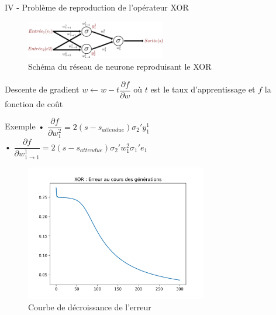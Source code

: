 \documentclass[10pt]{beamer}
\begin{document}
\begin{frame}{IV - Problème de reproduction de l'opérateur XOR}
\begin{figure}
	\centering
    \includegraphics[width=230px]{3-Model.png}
	\caption{Schéma du réseau de neurone reproduisant le XOR}
\end{figure}
\begin{block}{Descente de gradient}
$w \leftarrow w - t \dfrac{\partial f}{\partial w}$ où $t$ est le taux d'apprentissage et $f$ la fonction de coût
\end{block}
\begin{exampleblock}{Exemple}
• $\dfrac{\partial f}{\partial w^2_1} = 2(s - s_{attendue})\sigma_2 'y^1_1$ \\
• $\dfrac{\partial f}{\partial w^1_{1\to 1}} = 2(s - s_{attendue})\sigma_2 'w^2_1 \sigma _{1} ' e_{1}$
\end{exampleblock}

\end{frame}

\begin{frame}
\begin{figure}
	\centering
    \includegraphics[width=300px]{4-XOR.png}
	\caption{Courbe de décroissance de l'erreur}
\end{figure}
\end{frame}
\end{document}
